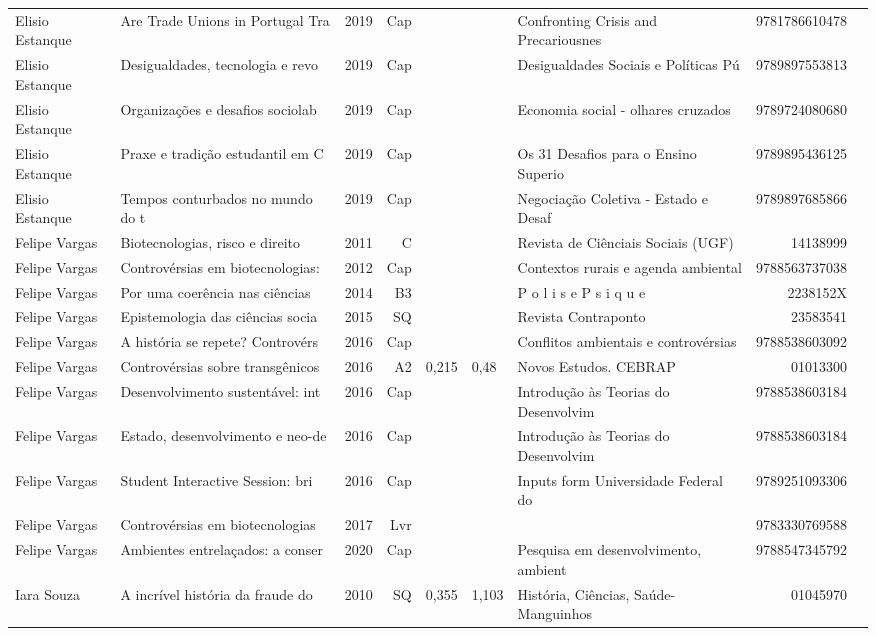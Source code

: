 \documentclass[12pt,brazil]{article}\usepackage[]{graphicx}\usepackage[]{xcolor}
\begin{document}
\begin{longtable}{lllrrllrr}
Elisio Estanque & Are Trade Unions in Portugal Tra & 2019 & Cap &  &  & Confronting Crisis and Precariousnes & 9781786610478 \\
Elisio Estanque & Desigualdades, tecnologia e revo & 2019 & Cap &  &  & Desigualdades Sociais e Políticas Pú & 9789897553813 \\
Elisio Estanque & Organizações e desafios sociolab & 2019 & Cap &  &  & Economia social - olhares cruzados & 9789724080680 \\
Elisio Estanque & Praxe e tradição estudantil em C & 2019 & Cap &  &  & Os 31 Desafios para o Ensino Superio & 9789895436125 \\
Elisio Estanque & Tempos conturbados no mundo do t & 2019 & Cap &  &  & Negociação Coletiva - Estado e Desaf & 9789897685866 \\
Felipe Vargas & Biotecnologias, risco e direito  & 2011 & C &  &  & Revista de Ciênciais Sociais (UGF) & 14138999 \\
Felipe Vargas & Controvérsias em biotecnologias: & 2012 & Cap &  &  & Contextos rurais e agenda ambiental  & 9788563737038 \\
Felipe Vargas & Por uma coerência nas ciências & 2014 & B3 &  &  & P o l i s e P s i q u e & 2238152X \\
Felipe Vargas & Epistemologia das ciências socia & 2015 & SQ &  &  & Revista Contraponto & 23583541 \\
Felipe Vargas & A história se repete? Controvérs & 2016 & Cap &  &  & Conflitos ambientais e controvérsias & 9788538603092 \\
Felipe Vargas & Controvérsias sobre transgênicos & 2016 & A2 & 0,215 & 0,48 & Novos Estudos. CEBRAP & 01013300 \\
Felipe Vargas & Desenvolvimento sustentável: int & 2016 & Cap &  &  & Introdução às Teorias do Desenvolvim & 9788538603184 \\
Felipe Vargas & Estado, desenvolvimento e neo-de & 2016 & Cap &  &  & Introdução às Teorias do Desenvolvim & 9788538603184 \\
Felipe Vargas & Student Interactive Session: bri & 2016 & Cap &  &  & Inputs form Universidade Federal do  & 9789251093306 \\
Felipe Vargas & Controvérsias em biotecnologias  & 2017 & Lvr &  &  &  & 9783330769588 \\
Felipe Vargas & Ambientes entrelaçados: a conser & 2020 & Cap &  &  & Pesquisa em desenvolvimento, ambient & 9788547345792 \\
Iara Souza & A incrível história da fraude do & 2010 & SQ & 0,355 & 1,103 & História, Ciências, Saúde-Manguinhos & 01045970 \\

\end{longtable}
\end{document}
